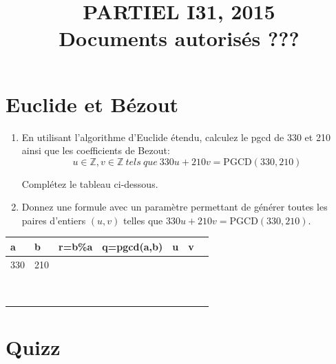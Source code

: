 \documentclass[11pt]{article}
\def\Z{\mathbb Z}
\begin{document}
\title{PARTIEL I31, 2015\\Documents autorisés ???}
\date{}\maketitle



\section{Euclide et Bézout}

\smallskip

\begin{enumerate}
\item  En utilisant l'algorithme d'Euclide étendu, calculez le pgcd de 330 et 210 ainsi que les coefficients de Bezout:
$$u\in \Z, v\in \Z \ tels \ que \ 330u+210v=\mbox{PGCD}(330, 210)$$

Complétez le tableau ci-dessous.


\item Donnez une formule avec un paramètre permettant de générer toutes les paires d'entiers  $(u, v)$ telles
que $330u+210v=\mbox{PGCD}(330, 210)$.
\end{enumerate}

\medskip
\begin{tabular}{|p{2cm}|p{2cm}|p{2cm}|p{2cm}|p{2cm}|p{2cm}|p{2cm}|}
\hline a & b & r=b\%a & q=pgcd(a,b) & u & v\\ 
\hline 330 & 210  &   &   &   & \\
&    &   &   &   & \\
\hline   &    &   &   &   & \\
&    &   &   &   & \\
\hline   &    &   &   &   & \\
 &    &   &   &   & \\
\hline   &    &   &   &   & \\
&    &   &   &   & \\
\hline   &    &   &   &   & \\
 &    &   &   &   & \\
\hline
\end{tabular}




\section{Quizz}
\end{document}
